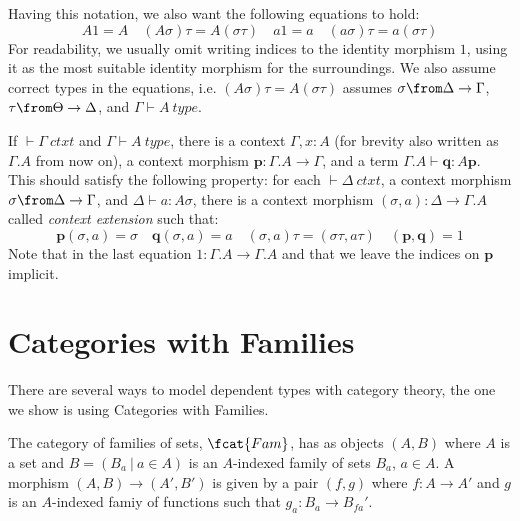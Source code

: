 Having this notation, we also want the following equations to hold:
\[
  A1=A \quad (A\sigma)\tau = A(\sigma\tau) \quad a1=a \quad (a\sigma)\tau=a(\sigma\tau)
\]
For readability, we usually omit writing indices to the identity morphism $1$,
using it as the most suitable identity morphism for the surroundings. We also
assume correct types in the equations, i.e. $(A\sigma)\tau = A(\sigma\tau)$
assumes $\sigma \from \Delta \to \Gamma$, $\tau \from \Theta \to \Delta$, and
$\Gamma \vdash A~type$.

\begin{definition}
  If $\vdash \Gamma~ctxt$ and $\Gamma \vdash A~type$, there is a context
  $\Gamma, x:A$ (for brevity also written as $\Gamma.A$ from now on), a context
  morphism $\mathbf{p}: \Gamma.A \to \Gamma$, and a term $\Gamma.A \vdash
  \mathbf{q} : A \mathbf{p}$. This should satisfy the following property: for
  each $\vdash \Delta~ctxt$, a context morphism $\sigma \from \Delta \to
  \Gamma$, and $\Delta \vdash a : A \sigma$, there is a context morphism
  $(\sigma, a): \Delta \to \Gamma.A$ called \emph{context extension} such that:
  \[
    \mathbf{p}(\sigma, a) = \sigma \quad \mathbf{q}(\sigma, a) = a \quad (\sigma, a) \tau =
    (\sigma \tau, a \tau) \quad (\mathbf{p}, \mathbf{q}) = 1
  \]
  Note that in the last equation $1: \Gamma.A \to \Gamma.A$ and that we leave
  the indices on $\mathbf{p}$ implicit.
\end{definition}

\section*{Categories with Families}

There are several ways to model dependent types with category theory, the one
we show is using Categories with Families.

\begin{definition}
  The category of families of sets, $\fcat{Fam}$, has as objects $(A, B)$ where
  $A$ is a set and $B = (B_a~|~a \in A)$ is an $A$-indexed family of sets $B_a$,
  $a \in A$. A morphism $(A, B) \to (A', B')$ is given by a pair $(f, g)$ where
  $f: A \to A'$ and $g$ is an $A$-indexed famiy of functions such that $g_a: B_a
  \to B_{fa}'$.
\end{definition}

